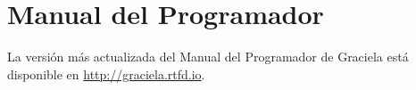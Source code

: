 \chapter{Manual del Programador}
\label{manual}

La versión más actualizada del Manual del Programador de Graciela
está disponible en \url{http://graciela.rtfd.io}. 

